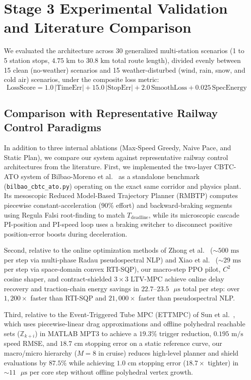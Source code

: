\documentclass[10pt,a4paper]{article}
\begin{document}
\section{Stage 3 Experimental Validation and Literature Comparison}

We evaluated the architecture across 30 generalized multi-station scenarios (1 to 5 station stops, $4.75\text{ km}$ to $30.8\text{ km}$ total route length), divided evenly between 15 clean (no-weather) scenarios and 15 weather-disturbed (wind, rain, snow, and cold air) scenarios, under the composite loss metric:
\begin{equation}
    \text{LossScore} = 1.0\,|\text{TimeErr}| + 15.0\,|\text{StopErr}| + 2.0\,\text{SmoothLoss} + 0.025\,\text{SpecEnergy}
\end{equation}

\subsection{Comparison with Representative Railway Control Paradigms}
In addition to three internal ablations (Max-Speed Greedy, Naive Pace, and Static Plan), we compare our system against representative railway control architectures from the literature. First, we implemented the two-layer CBTC-ATO system of Bilbao-Moreno et al.\ \cite{bilbao2025} as a standalone benchmark (\texttt{bilbao\_cbtc\_ato.py}) operating on the exact same corridor and physics plant. Its mesoscopic Reduced Model-Based Trajectory Planner (RMBTP) computes piecewise constant-acceleration ($90\%$ effort) and backward-braking segments using Regula Falsi root-finding to match $T_{\text{deadline}}$, while its microscopic cascade PI-position and PI-speed loop uses a braking switcher to disconnect positive position-error boosts during deceleration.

Second, relative to the online optimization methods of Zhong et al.\ \cite{zhong2022} ($\sim 500\text{ ms}$ per step via multi-phase Radau pseudospectral NLP) and Xiao et al.\ \cite{xiao2023} ($\sim 29\text{ ms}$ per step via space-domain convex RTI-SQP), our macro-step PPO pilot, $C^2$ cosine shaper, and contract-shielded $3\times 3$ LTV-MPC achieve online delay recovery and traction-chain energy savings in $22.7\text{--}23.5\text{ }\mu\text{s}$ total per step: over $1,200\times$ faster than RTI-SQP and $21,000\times$ faster than pseudospectral NLP.

Third, relative to the Event-Triggered Tube MPC (ETTMPC) of Sun et al.\ \cite{sun2024}, which uses piecewise-linear drag approximations and offline polyhedral reachable sets ($\mathbb{Z}_{k+i}$) in MATLAB MPT3 to achieve a $19.3\%$ trigger reduction, $0.195\text{ m/s}$ speed RMSE, and $18.7\text{ cm}$ stopping error on a static reference curve, our macro/micro hierarchy ($M=8$ in cruise) reduces high-level planner and shield evaluations by $87.5\%$ while achieving $1.0\text{ cm}$ stopping error ($18.7\times$ tighter) in $\sim 11\text{ }\mu\text{s}$ per core step without offline polyhedral vertex growth.
\end{document}
